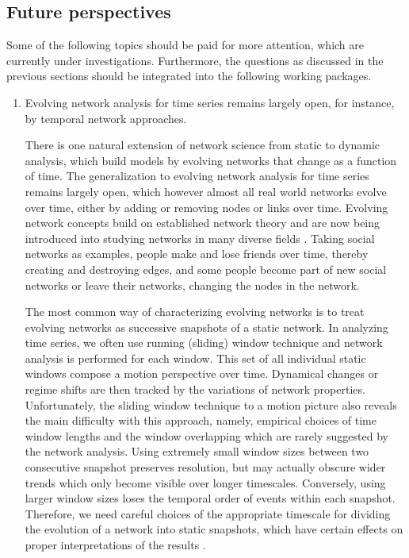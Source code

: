 	\subsection{Future perspectives}
	Some of the following topics should be paid for more attention, which are currently under investigations. Furthermore, the questions as discussed in the previous sections should be integrated into the following working packages. 
	\begin{enumerate}
		\item Evolving network analysis for time series remains largely open, for instance, by temporal network approaches. 

	There is one natural extension of network science from static to dynamic analysis, which build models by evolving networks that change as a function of time. The generalization to evolving network analysis for time series remains largely open, which however almost all real world networks evolve over time, either by adding or removing nodes or links over time. Evolving network concepts build on established network theory and are now being introduced into studying networks in many diverse fields \cite{Holme2012}. Taking social networks as examples, people make and lose friends over time, thereby creating and destroying edges, and some people become part of new social networks or leave their networks, changing the nodes in the network. 


	The most common way of characterizing evolving networks is to treat evolving networks as successive snapshots of a static network. In analyzing time series, we often use running (sliding) window technique and network analysis is performed for each window. This set of all individual static windows compose a motion perspective over time. Dynamical changes or regime shifts are then tracked by the variations of network properties. Unfortunately, the sliding window technique to a motion picture also reveals the main difficulty with this approach, namely, empirical choices of time window lengths and the window overlapping which are rarely suggested by the network analysis. Using extremely small window sizes between two consecutive snapshot preserves resolution, but may actually obscure wider trends which only become visible over longer timescales. Conversely, using larger window sizes loses the temporal order of events within each snapshot. Therefore, we need careful choices of the appropriate timescale for dividing the evolution of a network into static snapshots, which have certain effects on proper interpretations of the results \cite{Donges2011,Zou2014}. 


\end{enumerate}
